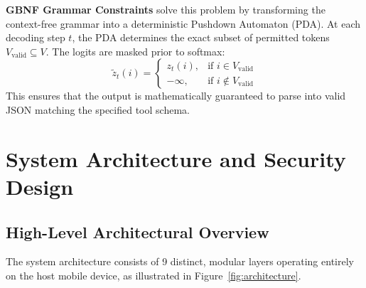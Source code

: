\documentclass[12pt,a4paper,oneside]{report}
\begin{document}
\textbf{GBNF Grammar Constraints} solve this problem by transforming the context-free grammar into a deterministic Pushdown Automaton (PDA). At each decoding step $t$, the PDA determines the exact subset of permitted tokens $V_{\text{valid}} \subseteq V$. The logits are masked prior to softmax:
\begin{equation}
    \tilde{z}_t(i) = \begin{cases}
        z_t(i), & \text{if } i \in V_{\text{valid}} \\
        -\infty, & \text{if } i \notin V_{\text{valid}}
    \end{cases}
\end{equation}
This ensures that the output is mathematically guaranteed to parse into valid JSON matching the specified tool schema.

\newpage
\chapter{System Architecture and Security Design}

\section{High-Level Architectural Overview}
The system architecture consists of 9 distinct, modular layers operating entirely on the host mobile device, as illustrated in Figure~\ref{fig:architecture}.
\end{document}
